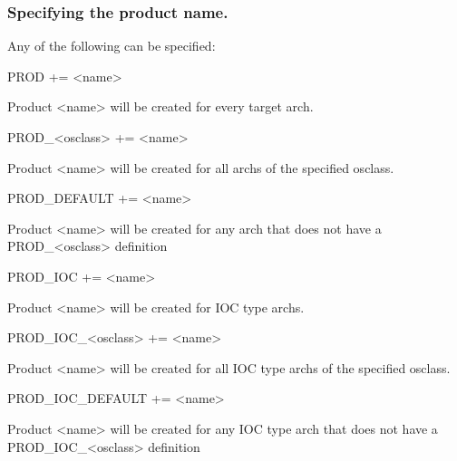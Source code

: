 \subsubsection{Specifying the product name.}

Any of the following can be specified:

\begin{description}\item {}PROD += \textless{}name\textgreater{}

\end{description}Product \textless{}name\textgreater{} will be created for every target arch.

\begin{description}\item PROD\_\textless{}osclass\textgreater{} += \textless{}name\textgreater{}

\end{description}Product \textless{}name\textgreater{} will be created for all archs of the specified osclass.

\begin{description}\item PROD\_DEFAULT += \textless{}name\textgreater{}

\end{description}Product \textless{}name\textgreater{} will be created for any arch that does not have a PROD\_\textless{}osclass\textgreater{} definition



\begin{description}\item {}PROD\_IOC += \textless{}name\textgreater{}

\end{description}Product \textless{}name\textgreater{} will be created for IOC type archs.

\begin{description}\item PROD\_IOC\_\textless{}osclass\textgreater{} += \textless{}name\textgreater{}

\end{description}Product \textless{}name\textgreater{} will be created for all IOC type archs of the specified osclass.

\begin{description}\item PROD\_IOC\_DEFAULT += \textless{}name\textgreater{}

\end{description}Product \textless{}name\textgreater{} will be created for any IOC type arch that does not have a PROD\_IOC\_\textless{}osclass\textgreater{} 
definition



